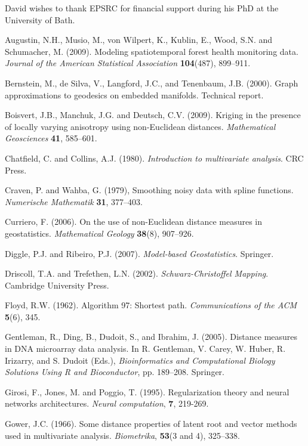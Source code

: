 \documentclass[useAMS, referee]{biom}
\begin{document}
David wishes to thank EPSRC for financial support during his PhD at the University of Bath.

\begin{thebibliography}{99}

\bibitem{} Augustin, N.H., Musio, M., von Wilpert, K., Kublin, E., Wood, S.N. and Schumacher, M. (2009). 
Modeling spatiotemporal forest health monitoring data. \textit{Journal of the American Statistical Association} \textbf{104}(487), 899--911.

\bibitem{} Bernstein, M., de Silva, V., Langford, J.C., and Tenenbaum, J.B. (2000). Graph approximations to geodesics on embedded manifolds. Technical report.

\bibitem{} Boisvert, J.B., Manchuk,  J.G. and Deutsch, C.V. (2009). Kriging in the presence of locally varying anisotropy using non-{E}uclidean distances. \textit{Mathematical Geosciences} \textbf{41}, 585--601.

\bibitem{} Chatfield, C. and Collins, A.J. (1980). \textit{Introduction to multivariate analysis}. CRC Press.

\bibitem{} Craven, P. and Wahba, G. (1979), Smoothing noisy data with spline functions. \textit{Numerische Mathematik} \textbf{31}, 377--403.

\bibitem{} Curriero, F. (2006). On the use of non-{E}uclidean distance measures in geostatistics. \textit{Mathematical Geology} \textbf{38}(8), 907--926.

\bibitem{} Diggle, P.J. and Ribeiro, P.J. (2007). \textit{Model-based Geostatistics}. Springer.

\bibitem{} 	Driscoll, T.A. and Trefethen, L.N. (2002). \textit{Schwarz-Christoffel Mapping}. Cambridge University Press.

\bibitem{} Floyd, R.W. (1962). Algorithm 97: Shortest path. \textit{Communications of the ACM} \textbf{5}(6), 345.

\bibitem{} Gentleman, R., Ding, B., Dudoit, S., and Ibrahim, J. (2005). Distance measures in DNA microarray data analysis. In R. Gentleman, V. Carey, W. Huber, R. Irizarry, and S. Dudoit (Eds.), \textit{Bioinformatics and Computational Biology Solutions Using R and Bioconductor}, pp. 189--208. Springer.

\bibitem{} Girosi, F., Jones, M. and Poggio, T. (1995). Regularization theory and neural networks architectures. \textit{Neural computation}, \textbf{7}, 219-269.

\bibitem{} Gower, J.C. (1966). Some distance properties of latent root and vector methods used in multivariate analysis. \textit{Biometrika}, \textbf{53}(3 and 4), 325--338.


\end{thebibliography}
\end{document}
